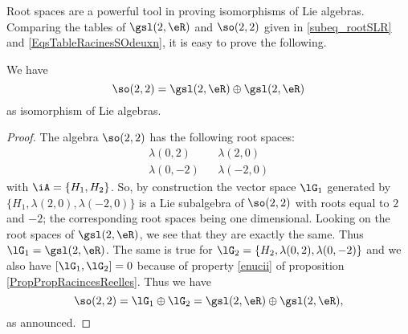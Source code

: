 Root spaces are a powerful tool in proving isomorphisms of Lie algebras. Comparing the tables of $\gsl(2,\eR)$ and $\so(2,2)$ given in \ref{subeq_rootSLR} and \ref{EqsTableRacinesSOdeuxn}, it is easy to prove the following.

\begin{proposition}
We have
\begin{equation}
	\so(2,2)=\gsl(2,\eR)\oplus\gsl(2,\eR)
\end{equation}
as isomorphism of Lie algebras.
\end{proposition}

\begin{proof}
The algebra $\so(2,2)$ has the following root spaces:
\begin{align*}
\lambda(0,2)&&\lambda(2,0)\\
\lambda(0,-2)&&\lambda(-2,0)
\end{align*}
with $\iA=\{ H_1,H_2 \}$. So, by construction the vector space $\lG_1$ generated by $\{ H_1,\lambda(2,0),\lambda(-2,0) \}$ is a Lie subalgebra of $\so(2,2)$ with roots equal to $2$ and $-2$; the corresponding root spaces being one dimensional. Looking on the root spaces of $\gsl(2,\eR)$, we see that they are exactly the same. Thus $\lG_1=\gsl(2,\eR)$. The same is true for $\lG_2=\{ H_2,\lambda(0,2),\lambda(0,-2)  \}$ and we also have $[\lG_1,\lG_2]=0$ because of property \ref{enucii} of proposition \ref{PropPropRacincesReelles}. Thus we have
\[ 
	\so(2,2)=\lG_1\oplus\lG_2=\gsl(2,\eR)\oplus\gsl(2,\eR),
\]
as announced.
\end{proof}
